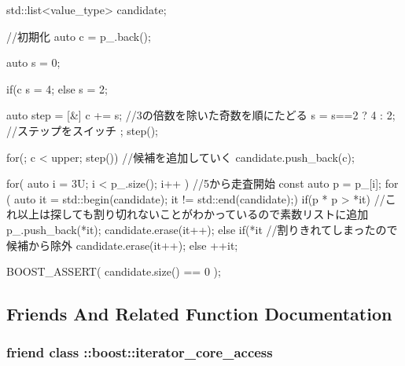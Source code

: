 \begin{DoxyCode}
        {
            std::list<value_type> candidate{};

            {   //初期化
                auto c = p_.back();

                auto s = 0;
            
                if(c %
                    s = 4;
                else
                    s = 2;
            
                auto step = [&]{
                    c += s;           //3の倍数を除いた奇数を順にたどる
                    s = s==2 ? 4 : 2; //ステップをスイッチ
                };
                step();
            
                for(; c < upper; step())
                { //候補を追加していく
                    candidate.push_back(c);
                }
            }

            for( auto i = 3U; i < p_.size(); i++ )
            {   //5から走査開始
                const auto p = p_[i];
                for ( auto it = std::begin(candidate);
                      it != std::end(candidate);)
                {
                    if(p * p > *it)
                    {   //これ以上は探しても割り切れないことがわかっているので素数リストに追加
                        p_.push_back(*it);
                        candidate.erase(it++);
                    }
                    else if(*it %
                    {   //割りきれてしまったので候補から除外
                        candidate.erase(it++);
                    }
                    else
                    {
                        ++it;
                    }
                }
            }
            
            BOOST_ASSERT( candidate.size() == 0 );
        }
\end{DoxyCode}


\subsection{\-Friends \-And \-Related \-Function \-Documentation}
\hypertarget{classyuh_1_1range__detail_1_1prime__iterator_a986bf0deaa7559f361d03122eeea4c86}{
\subsubsection[{\-::boost\-::iterator\-\_\-core\-\_\-access}]{\setlength{\rightskip}{0pt plus 5cm}friend class \-::boost\-::iterator\-\_\-core\-\_\-access}}\label{d9/dc8/classyuh_1_1range__detail_1_1prime__iterator_a986bf0deaa7559f361d03122eeea4c86}


